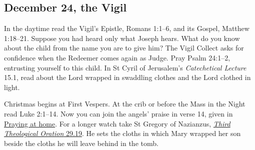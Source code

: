 \subsection{December 24, the Vigil}
\label{sec:advent-daily-vigil}

In the daytime read the Vigil's Epistle, Romans 1:1--6, and its Gospel,
Matthew 1:18--21. Suppose you had heard only what Joseph hears. What
do you know about the child from the name you are to give him?
The Vigil Collect asks for confidence when the Redeemer comes again as
Judge. Pray Psalm 24:1--2, entrusting yourself to this child. In
St Cyril of Jerusalem's \emph{Catechetical Lecture} 15.1, read about the
Lord wrapped in swaddling clothes and the Lord clothed in light.

Christmas begins at First Vespers. At the crib or before the Mass in
the Night read Luke 2:1--14. Now you can join the angels' praise in
verse 14, given in \hyperref[sec:advent-home-prayers]{Praying at home}. For a longer watch take
St Gregory of Nazianzus, \href{https://www.newadvent.org/fathers/310229.htm}{\emph{Third Theological Oration} 29.19}.
He sets the cloths in which Mary wrapped her son beside the cloths
he will leave behind in the tomb.
